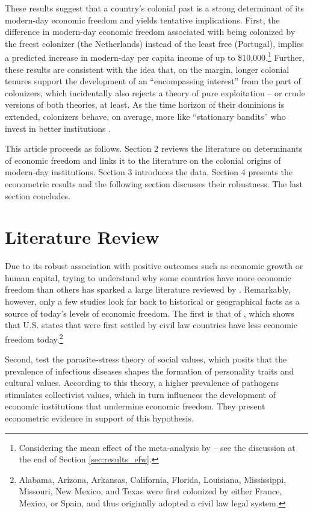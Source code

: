 \documentclass[a4paper,12pt]{article}
\begin{document}
These results suggest that a country's colonial past is a strong determinant of its modern-day economic freedom and yields tentative implications. First, the difference in modern-day economic freedom associated with being colonized by the freest colonizer (the Netherlands) instead of the least free (Portugal), implies a predicted increase in modern-day per capita income of up to \$10,000.\footnote{Considering the mean effect of the meta-analysis by \cite{lawson2024economic} -- see the discussion at the end of Section \ref{sec:results_efw}.} Further, these results are consistent with the idea that, on the margin, longer colonial tenures support the development of an ``encompassing interest'' from the part of colonizers, which incidentally also rejects a theory of pure exploitation \citep{grier1999colonial} -- or crude versions of both theories, at least. As the time horizon of their dominions is extended, colonizers behave, on average, more like ``stationary bandits'' who invest in better institutions \citep{olson1993dictatorship,Olson2000}. 

This article proceeds as follows. Section 2 reviews the literature on determinants of economic freedom and links it to the literature on the colonial origins of modern-day institutions. Section 3 introduces the data. Section 4 presents the econometric results and the following section discusses their robustness. The last section concludes. 

\section{Literature Review}

Due to its robust association with positive outcomes such as economic growth or human capital, trying to understand why some countries have more economic freedom than others has sparked a large literature reviewed by \cite{lawson2020determinants}. Remarkably, however, only a few studies look far back to historical or geographical facts as a source of today's levels of economic freedom. The first is that of \cite{nattinger2012legal}, which shows that U.S. states that were first settled by civil law countries have less economic freedom today.\footnote{Alabama, Arizona, Arkansas, California, Florida, Louisiana, Mississippi, Missouri, New Mexico, and Texas were first colonized by either France, Mexico, or Spain, and thus originally adopted a civil law legal system.} 

Second, \cite{nikolaev2017historical} test the parasite-stress theory of social values, which posits that the prevalence of infectious diseases shapes the formation of personality traits and cultural values. According to this theory, a higher prevalence of pathogens stimulates collectivist values, which in turn influences the development of economic institutions that undermine economic freedom. They present econometric evidence in support of this hypothesis.
\end{document}
